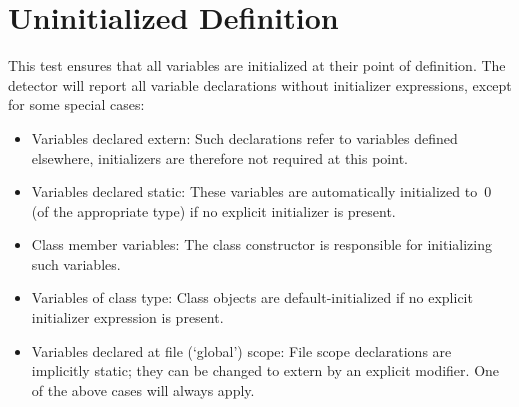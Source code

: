 %
%

\section{Uninitialized Definition}
\label{UninitializedDefinition::overview}

This test ensures that all variables are initialized at their point of
definition. The detector will report all variable declarations without
initializer expressions, except for some special cases:
                                                                                                                                                                                                  
\begin{itemize}
\item Variables declared extern: Such declarations refer to variables defined
elsewhere, initializers are therefore not required at this point.
\item Variables declared static: These variables are automatically initialized
to~0 (of the appropriate type) if no explicit initializer is present.
\item Class member variables: The class constructor is responsible for
initializing such variables.
\item Variables of class type: Class objects are default-initialized if no
explicit initializer expression is present.
\item Variables declared at file (`global') scope: File scope declarations are
implicitly static; they can be changed to extern by an explicit modifier. One
of the above cases will always apply.
\end{itemize}
 

